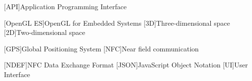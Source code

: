 [API]{Application Programming Interface}

[OpenGL ES]{OpenGL for Embedded Systems}
[3D]{Three-dimensional space}
[2D]{Two-dimensional space}

[GPS]{Global Positioning System}
[NFC]{Near field communication}

[NDEF]{NFC Data Exchange Format}
[JSON]{JavaScript Object Notation}
[UI]{User Interface}